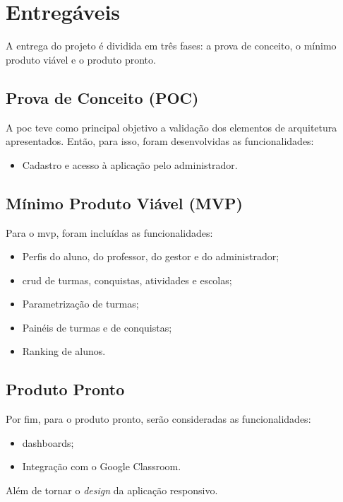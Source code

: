 \section{Entregáveis}
A entrega do projeto é dividida em três fases: a prova de conceito, o mínimo produto viável e o produto pronto.

\subsection{Prova de Conceito (POC)}
A \ac{poc} teve como principal objetivo a validação dos elementos de arquitetura apresentados. Então, para isso, foram desenvolvidas as funcionalidades:
 \begin{itemize}
     \item Cadastro e acesso à aplicação pelo administrador.
 \end{itemize}

\subsection{Mínimo Produto Viável (MVP)}
Para o \ac{mvp}, foram incluídas as funcionalidades:
\begin{itemize}
    \item Perfis do aluno, do professor, do gestor e do administrador;
    \item \ac{crud} de turmas, conquistas, atividades e escolas;
    \item Parametrização de turmas;
    \item Painéis de turmas e de conquistas;
    \item Ranking de alunos.
\end{itemize}

\subsection{Produto Pronto}
Por fim, para o produto pronto, serão consideradas as funcionalidades:

\begin{itemize}
    \item \glspl{dashboard};
    \item Integração com o Google Classroom.
\end{itemize}

Além de tornar o \textit{design} da aplicação responsivo.